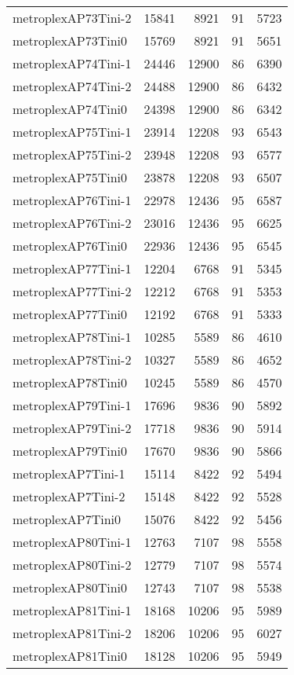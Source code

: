 \begin{longtable}{lrrrr}
metroplexAP73Tini-2 & 15841 & 8921 & 91 & 5723 \\
metroplexAP73Tini0 & 15769 & 8921 & 91 & 5651 \\
metroplexAP74Tini-1 & 24446 & 12900 & 86 & 6390 \\
metroplexAP74Tini-2 & 24488 & 12900 & 86 & 6432 \\
metroplexAP74Tini0 & 24398 & 12900 & 86 & 6342 \\
metroplexAP75Tini-1 & 23914 & 12208 & 93 & 6543 \\
metroplexAP75Tini-2 & 23948 & 12208 & 93 & 6577 \\
metroplexAP75Tini0 & 23878 & 12208 & 93 & 6507 \\
metroplexAP76Tini-1 & 22978 & 12436 & 95 & 6587 \\
metroplexAP76Tini-2 & 23016 & 12436 & 95 & 6625 \\
metroplexAP76Tini0 & 22936 & 12436 & 95 & 6545 \\
metroplexAP77Tini-1 & 12204 & 6768 & 91 & 5345 \\
metroplexAP77Tini-2 & 12212 & 6768 & 91 & 5353 \\
metroplexAP77Tini0 & 12192 & 6768 & 91 & 5333 \\
metroplexAP78Tini-1 & 10285 & 5589 & 86 & 4610 \\
metroplexAP78Tini-2 & 10327 & 5589 & 86 & 4652 \\
metroplexAP78Tini0 & 10245 & 5589 & 86 & 4570 \\
metroplexAP79Tini-1 & 17696 & 9836 & 90 & 5892 \\
metroplexAP79Tini-2 & 17718 & 9836 & 90 & 5914 \\
metroplexAP79Tini0 & 17670 & 9836 & 90 & 5866 \\
metroplexAP7Tini-1 & 15114 & 8422 & 92 & 5494 \\
metroplexAP7Tini-2 & 15148 & 8422 & 92 & 5528 \\
metroplexAP7Tini0 & 15076 & 8422 & 92 & 5456 \\
metroplexAP80Tini-1 & 12763 & 7107 & 98 & 5558 \\
metroplexAP80Tini-2 & 12779 & 7107 & 98 & 5574 \\
metroplexAP80Tini0 & 12743 & 7107 & 98 & 5538 \\
metroplexAP81Tini-1 & 18168 & 10206 & 95 & 5989 \\
metroplexAP81Tini-2 & 18206 & 10206 & 95 & 6027 \\
metroplexAP81Tini0 & 18128 & 10206 & 95 & 5949 \\

\end{longtable}
